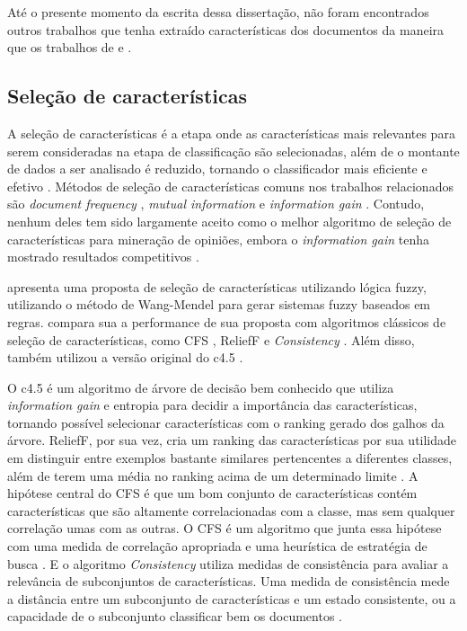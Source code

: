 \documentclass[template.tex]{subfiles}
\begin{document}
Até o presente momento da escrita dessa dissertação, não foram encontrados outros trabalhos que tenha extraído características dos documentos da maneira que os trabalhos de  e .

\subsection{Seleção de características}

A seleção de características é a etapa onde as características mais relevantes para serem consideradas na etapa de classificação são selecionadas, além de o montante de dados a ser analisado é reduzido, tornando o classificador mais eficiente e efetivo \cite{moraes2012document}. Métodos de seleção de características comuns nos trabalhos relacionados são \textit{document frequency} \cite{pang2002thumbs}, \textit{mutual information} \cite{turney2002thumbs} e \textit{information gain} \cite{wiebe2006word}. Contudo, nenhum deles tem sido largamente aceito como o melhor algoritmo de seleção de características para mineração de opiniões, embora o \textit{information gain} tenha mostrado resultados competitivos \cite{moraes2012document}.

 apresenta uma proposta de seleção de características utilizando lógica fuzzy, utilizando o método de Wang-Mendel \cite{wang1992generating} para gerar sistemas fuzzy baseados em regras.  compara sua a performance de sua proposta com algoritmos clássicos de seleção de características, como CFS \cite{hall1999correlation}, ReliefF \cite{kira1992practical} e \textit{Consistency} \cite{liu1996probabilistic}. Além disso, também utilizou a versão original do c4.5 \cite{salzberg1994c4}. 

O c4.5 é um algoritmo de árvore de decisão bem conhecido que utiliza \textit{information gain} e entropia para decidir a importância das características, tornando possível selecionar características com o ranking gerado dos galhos da árvore. ReliefF, por sua vez, cria um ranking das características por sua utilidade em distinguir entre exemplos bastante similares pertencentes a diferentes classes, além de terem uma média no ranking acima de um determinado limite \cite{cintra2008fuzzy}. A hipótese central do CFS é que um bom conjunto de características contém características que são altamente correlacionadas com a classe, mas sem qualquer correlação umas com as outras. O CFS é um algoritmo que junta essa hipótese com uma medida de correlação apropriada e uma heurística de estratégia de busca \cite{hall1999correlation}. E o algoritmo \textit{Consistency} utiliza medidas de consistência para avaliar a relevância de subconjuntos de características. Uma medida de consistência  mede a distância entre um subconjunto de características e um estado consistente, ou a capacidade de o subconjunto classificar bem os documentos \cite{liu1996probabilistic}.
\end{document}

